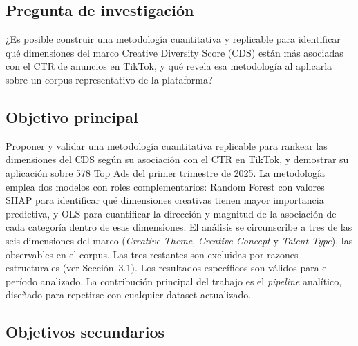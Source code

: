 \documentclass[12pt, a4paper]{report}
\begin{document}
\subsection{Pregunta de investigación}

¿Es posible construir una metodología cuantitativa y replicable para identificar qué
dimensiones del marco Creative Diversity Score (CDS) están más asociadas con el CTR
de anuncios en TikTok, y qué revela esa metodología al aplicarla sobre un corpus
representativo de la plataforma?

\subsection{Objetivo principal}

Proponer y validar una metodología cuantitativa replicable para rankear las dimensiones
del CDS según su asociación con el CTR en TikTok, y demostrar su aplicación sobre 578
Top Ads del primer trimestre de 2025. La metodología emplea dos modelos con roles
complementarios: Random Forest con valores SHAP para identificar qué dimensiones
creativas tienen mayor importancia predictiva, y OLS para cuantificar la dirección y
magnitud de la asociación de cada categoría dentro de esas dimensiones. El análisis se circunscribe a tres de las seis dimensiones
del marco (\textit{Creative Theme}, \textit{Creative Concept} y \textit{Talent Type}),
las observables en el corpus. Las tres restantes son
excluidas por razones estructurales (ver Sección~3.1). Los resultados específicos son
válidos para el período analizado. La contribución principal del trabajo es el
\textit{pipeline} analítico, diseñado para repetirse con cualquier dataset actualizado.

\subsection{Objetivos secundarios}
\end{document}
